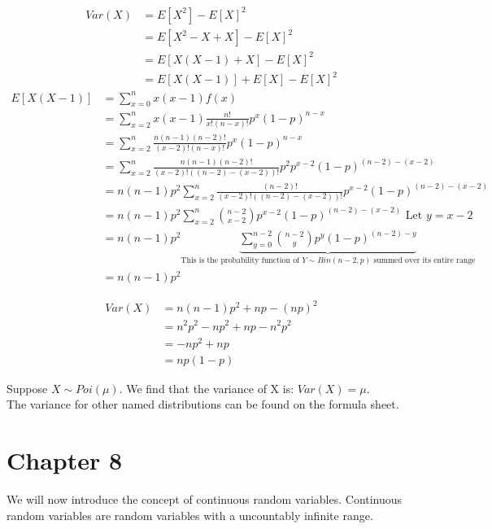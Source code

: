 \documentclass[12pt, letterpaper]{article}
\begin{document}
\begin{align*}
Var\left(X\right) &= E[X^2] - E[X]^2\\
&= E[X^2 - X + X] - E[X]^2\\
&= E[X(X - 1) + X] - E[X]^2\\
&= E[X(X - 1)] + E[X] - E[X]^2
\end{align*}
\begin{align*}
E[X(X - 1)] &= \sum_{x = 0}^{n} x(x - 1)f\left(x\right)\\
&= \sum_{x = 2}^{n} x(x - 1) \frac{n!}{x! (n - x)!} p^x (1 - p)^{n - x}\\
&= \sum_{x = 2}^{n} \frac{n(n - 1)(n - 2)!}{(x - 2)! (n - x)!} p^x (1 - p)^{n - x}\\
&= \sum_{x = 2}^{n} \frac{n(n - 1)(n - 2)!}{(x - 2)! ((n - 2) - (x - 2))!} p^2 p^{x - 2} (1 - p)^{(n - 2) - (x - 2)}\\
&= n(n - 1)p^2 \sum_{x = 2}^{n} \frac{(n - 2)!}{(x - 2)! ((n - 2) - (x - 2))!} p^{x - 2} (1 - p)^{(n - 2) - (x - 2)}\\
&= n(n - 1)p^2 \sum_{x = 2}^{n} {{n - 2} \choose {x - 2}} p^{x - 2} (1 - p)^{(n - 2) - (x - 2)} \text{ Let } y = x - 2 \\
&= n(n - 1)p^2 \underbrace{\sum_{y = 0}^{n - 2} {{n - 2} \choose y} p^{y} (1 - p)^{(n - 2) - y}}_\text{This is the probability function of $Y \sim Bin(n - 2, p)$ summed over its entire range}\\
&= n(n - 1)p^2
\end{align*}

\begin{align*}
Var\left(X\right) &= n(n - 1)p^2 + np - (np)^2\\
&= n^2 p^2 - np^2 + np - n^2 p^2\\
&= -np^2 + np\\
&= np (1 - p)
\end{align*}

Suppose \(X \sim Poi(\mu)\). We find that the variance of X is: \(Var\left(X\right) = \mu\).\\

The variance for other named distributions can be found on the formula sheet.

\section{Chapter 8}
We will now introduce the concept of continuous random variables. Continuous random variables are random variables with a uncountably infinite range.\\
\end{document}
